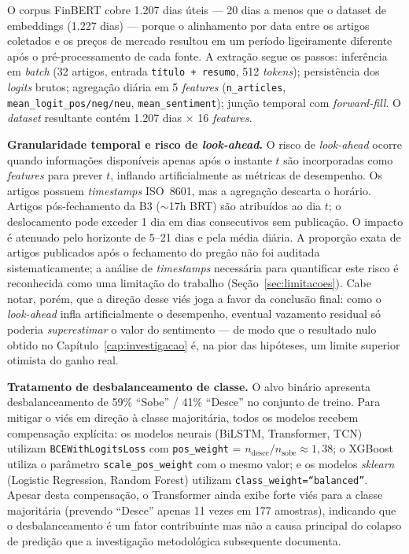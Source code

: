 O corpus FinBERT cobre 1.207 dias úteis --- 20 dias a menos que o dataset de embeddings (1.227 dias) --- porque o alinhamento por data entre os artigos coletados e os preços de mercado resultou em um período ligeiramente diferente após o pré-processamento de cada fonte. A extração segue os passos: inferência em \textit{batch} (32 artigos, entrada \texttt{título + resumo}, 512 \textit{tokens}); persistência dos \textit{logits} brutos; agregação diária em 5 \textit{features} (\texttt{n\_articles}, \texttt{mean\_logit\_pos/\allowbreak neg/\allowbreak neu}, \texttt{mean\_sentiment}); junção temporal com \textit{forward-fill}. O \textit{dataset} resultante contém 1.207 dias $\times$ 16 \textit{features}.

\textbf{Granularidade temporal e risco de \textit{look-ahead}.} O risco de \textit{look-ahead} ocorre quando informações disponíveis apenas após o instante $t$ são incorporadas como \textit{features} para prever $t$, inflando artificialmente as métricas de desempenho. Os artigos possuem \textit{timestamps} ISO~8601, mas a agregação descarta o horário. Artigos pós-fechamento da B3 ($\sim$17h BRT) são atribuídos ao dia $t$; o deslocamento pode exceder 1 dia em dias consecutivos sem publicação. O impacto é atenuado pelo horizonte de 5--21 dias e pela média diária. A proporção exata de artigos publicados após o fechamento do pregão não foi auditada sistematicamente; a análise de \textit{timestamps} necessária para quantificar este risco é reconhecida como uma limitação do trabalho (Seção~\ref{sec:limitacoes}). Cabe notar, porém, que a direção desse viés joga a favor da conclusão final: como o \textit{look-ahead} infla artificialmente o desempenho, eventual vazamento residual só poderia \emph{superestimar} o valor do sentimento --- de modo que o resultado nulo obtido no Capítulo~\ref{cap:investigacao} é, na pior das hipóteses, um limite superior otimista do ganho real.

\textbf{Tratamento de desbalanceamento de classe.} O alvo binário apresenta desbalanceamento de 59\% ``Sobe'' / 41\% ``Desce'' no conjunto de treino. Para mitigar o viés em direção à classe majoritária, todos os modelos recebem compensação explícita: os modelos neurais (BiLSTM, Transformer, TCN) utilizam \texttt{BCEWithLogitsLoss} com \texttt{pos\_weight} = $n_\text{desce} / n_\text{sobe} \approx 1{,}38$; o XGBoost utiliza o parâmetro \texttt{scale\_pos\_weight} com o mesmo valor; e os modelos \textit{sklearn} (Logistic Regression, Random Forest) utilizam \texttt{class\_weight=``balanced''}. Apesar desta compensação, o Transformer ainda exibe forte viés para a classe majoritária (prevendo ``Desce'' apenas 11 vezes em 177 amostras), indicando que o desbalanceamento é um fator contribuinte mas não a causa principal do colapso de predição que a investigação metodológica subsequente documenta.

